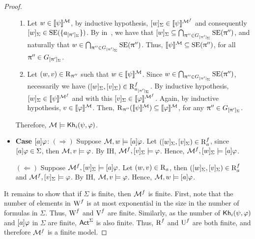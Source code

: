 \begin{proof}
\begin{itemize}
    \begin{enumerate}
        \item Let $w \in \llbracket \psi \rrbracket^{\mathcal{M}}$, by inductive hypothesis, $[w]_\Sigma \in \llbracket \psi \rrbracket^{\mathcal{M}^f}$ and consequently $[w]_\Sigma \in \operatorname{SE}(\{ a_{[\uppi']_\Sigma} \})$.
        By  in~, we have that $[w]_\Sigma \subseteq \bigcap_{\uppi'' \in G_{[\uppi']_\Sigma}} \operatorname{SE}(\uppi'')$, and naturally that $w \in \bigcap_{\uppi'' \in G_{[\uppi']_\Sigma}} \operatorname{SE}(\uppi'')$.
        Thus, $\llbracket \psi \rrbracket^{\mathcal{M}} \subseteq \operatorname{SE}(\uppi'')$, for all $\uppi'' \in G_{[\uppi']_\Sigma}$.

        \item Let $(w,v) \in \operatorname{R}_{\uppi''}$ such that $w \in \llbracket \psi \rrbracket^{\mathcal{M}}$.
        Since $w \in \bigcap_{\uppi'' \in G_{[\uppi']_\Sigma}} \operatorname{SE}(\uppi'')$, necessarily we have $([w]_\Sigma,[v]_\Sigma) \in \operatorname{R}^f_{a_{[\uppi']_\Sigma}}$.
        By inductive hypothesis, $[w]_\Sigma \in \llbracket \psi \rrbracket^{\mathcal{M}^f}$ and with this $[v]_\Sigma \in \llbracket \varphi \rrbracket^{\mathcal{M}^f}$.
        Again, by inductive hypothesis, $v \in \llbracket \varphi \rrbracket^{\mathcal{M}}$. Then, $\operatorname{R}_{\uppi''}(\llbracket \psi \rrbracket^{\mathcal{M}}) \subseteq \llbracket \varphi \rrbracket^{\mathcal{M}}$, for any $\uppi'' \in G_{[\uppi']_\Sigma}$.
    \end{enumerate}

Therefore, $\mathcal{M} \models {\sf Kh}_i(\psi,\varphi)$. 

\item \textbf{Case $[a]\varphi$}: $(\Rightarrow)$ Suppose $\mathcal{M},w \models [a]\varphi$.
Let $([w]_\Sigma,[v]_\Sigma) \in \operatorname{R}^f_a$, since $[a]\varphi \in \Sigma$, then $\mathcal{M},v \models \varphi$.
By IH, $\mathcal{M}^f,[v]_\Sigma \models \varphi$.
Hence, $\mathcal{M}^f,[w]_\Sigma \models [a]\varphi$.

$(\Leftarrow)$ Suppose $\mathcal{M}^f,[w]_\Sigma \models [a]\varphi$.
Let $(w,v) \in \operatorname{R}_a$, then $([w]_\Sigma,[v]_\Sigma) \in \operatorname{R}^f_a$ and $\mathcal{M}^f,[v]_\Sigma \models \varphi$.
By IH, $\mathcal{M},v \models \varphi$.
Hence, $\mathcal{M},w \models [a]\varphi$.
\end{itemize}

It remains to show that if $\Sigma$ is finite, then $\mathcal{M}^f$ is finite.
First, note that the number of elements in $\operatorname{W}^f$ is at most exponential in the size in the number of formulas in $\Sigma$.
Thus, $\operatorname{W}^f$ and $\operatorname{V}^f$ are finite. Similarly, as the number of ${\sf Kh}_i(\psi,\varphi)$ and $[a] \varphi$ in $\Sigma$ are finite, ${\rm \sf Act}^{\Sigma}$ is also finite.
Thus, $\operatorname{R}^f$ and $\operatorname{U}^f$ are both finite, and therefore $\mathcal{M}^f$ is a finite model.
\end{proof}

